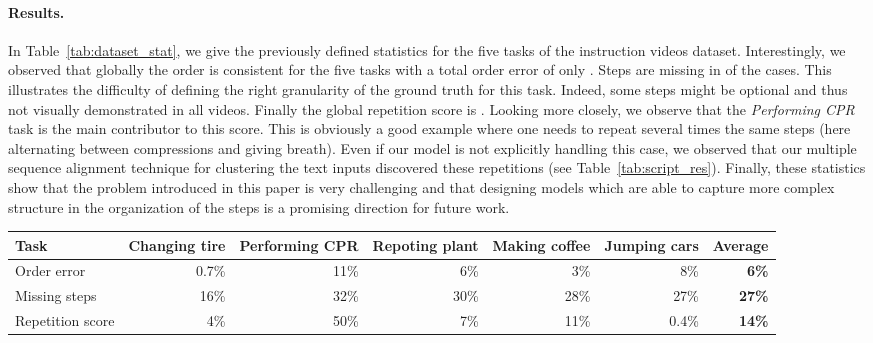 \documentclass[10pt,twocolumn,letterpaper]{article}
\begin{document}
\paragraph{Results.}
In Table~\ref{tab:dataset_stat}, we give the previously defined statistics for the five tasks of the instruction videos dataset.
Interestingly, we observed that globally the order is consistent for the five tasks with a total order error of only .
Steps are missing in  of the cases. 
This illustrates the difficulty of defining the right granularity of the ground truth for this task. 
Indeed, some steps might be optional and thus not visually demonstrated in all videos.
Finally the global repetition score is .
Looking more closely, we observe that the \emph{Performing CPR} task is the main contributor to this score.
This is obviously a good example where one needs to repeat several times the same steps (here alternating between compressions and giving breath).
Even if our model is not explicitly handling this case, we observed that our multiple sequence alignment technique for clustering the text inputs discovered these repetitions (see Table~\ref{tab:script_res}).
Finally, these statistics show that the problem introduced in this paper is very challenging and that designing models which are able to capture more complex structure in the organization of the steps is a promising direction for future work.

\begin{table*}[ht]
\centering
\begin{tabular}{@{}lrrrrrr@{}}
\toprule
Task             & \multicolumn{1}{l}{Changing tire} & \multicolumn{1}{l}{Performing CPR} & \multicolumn{1}{l}{Repoting plant} & Making coffee & \multicolumn{1}{c}{Jumping cars} & \multicolumn{1}{c}{\textbf{Average}} \\ \midrule
Order error      & 0.7\%                             & 11\%                               & 6\%                                & 3\%           & 8\%                              & \textbf{6\%}                       \\
Missing steps    & 16\%                              & 32\%                               & 30\%                               & 28\%          & 27\%                             & \textbf{27\%}                      \\
Repetition score & 4\%                               & 50\%                               & 7\%                                & 11\%          & 0.4\%                            & \textbf{14\%}                      \\ \bottomrule
\end{tabular}
\caption{Statistics of the instruction video dataset.}
\label{tab:dataset_stat}
\end{table*}
\end{document}
